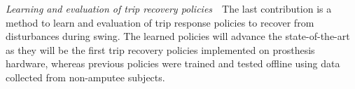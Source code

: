 \begin{contributions}
    \item\label{contrib:trip_recovery} \emph{Learning and evaluation of trip
    recovery policies}~~The last contribution is a method to learn and
    evaluation of trip response policies to recover from disturbances during
    swing. The learned policies will advance the state-of-the-art as they will
    be the first trip recovery policies implemented on prosthesis hardware,
    whereas previous policies were trained and tested offline using data
    collected from non-amputee subjects.
\end{contributions}
